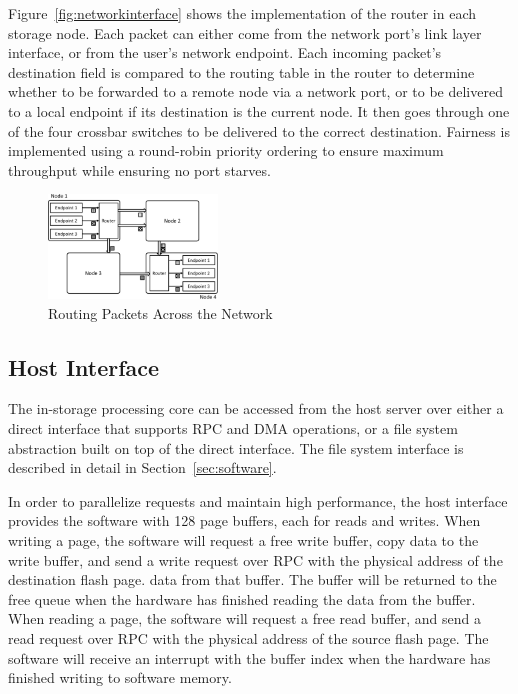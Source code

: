Figure~\ref{fig:networkinterface} shows the implementation of the router in each
storage node. Each packet can either come from the network port's link layer
interface, or from the user's network endpoint. Each incoming packet's
destination field is compared to the routing table in the router to determine
whether to be forwarded to a remote node via a network port, or to be delivered
to a local endpoint if its destination is the current node. It then goes through
one of the four crossbar switches to be delivered to the correct destination. 
Fairness is implemented using a round-robin priority ordering to ensure maximum
throughput while ensuring no port starves.

\begin{figure}[h]
	\begin{center}
	\includegraphics[width=0.4\textwidth]{figures/routing-crop.pdf}
	\caption{Routing Packets Across the Network}
	\label{fig:networkrouting}
	\end{center}
\end{figure}


\subsection{Host Interface}

The in-storage processing core can be accessed from the host server over either
a direct interface that supports RPC and DMA operations, or a file system
abstraction built on top of the direct interface. The file system interface is
described in detail in Section~\ref{sec:software}.

In order to parallelize requests and maintain high performance, the host
interface provides the software with 128 page buffers, each for reads and
writes. When writing a page, the software will request a free write buffer, copy
data to the write buffer, and send a write request over RPC with the
physical address of the destination flash page.
data from that buffer. The buffer will be returned to the free queue when the
hardware has finished reading the data from the buffer. When reading a page, the
software will request a free read buffer, and send a read request over RPC with
the physical address of the source flash page. The software will receive an
interrupt with the buffer index when the hardware has finished writing to
software memory.

